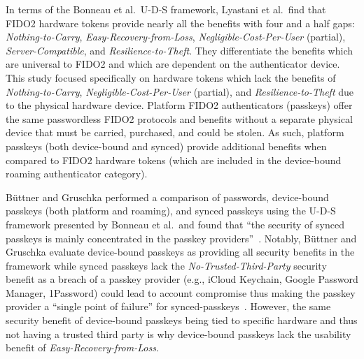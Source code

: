In terms of the Bonneau et al.\ U-D-S framework, Lyastani et al.\ find that FIDO2 hardware tokens provide nearly all the benefits with four and a half gaps: \emph{Nothing-to-Carry}, \emph{Easy-Recovery-from-Loss}, \emph{Negligible-Cost-Per-User} (partial), \emph{Server-Compatible}, and \emph{Resilience-to-Theft}. They differentiate the benefits which are universal to FIDO2 and which are dependent on the authenticator device. This study focused specifically on hardware tokens which lack the benefits of \emph{Nothing-to-Carry}, \emph{Negligible-Cost-Per-User} (partial), and \emph{Resilience-to-Theft} due to the physical hardware device. Platform FIDO2 authenticators (passkeys) offer the same passwordless FIDO2 protocols and benefits without a separate physical device that must be carried, purchased, and could be stolen. As such, platform passkeys (both device-bound and synced) provide additional benefits when compared to FIDO2 hardware tokens (which are included in the device-bound roaming authenticator category).

B\"uttner and Gruschka performed a comparison of passwords, device-bound passkeys (both platform and roaming), and synced passkeys using the U-D-S framework presented by Bonneau et al.\ and found that ``the security of synced passkeys is mainly concentrated in the passkey providers''~\cite{buttner_passkey_2025}. Notably, B\"uttner and Gruschka evaluate device-bound passkeys as providing all security benefits in the framework while synced passkeys lack the \emph{No-Trusted-Third-Party} security benefit as a breach of a passkey provider (e.g., iCloud Keychain, Google Password Manager, 1Password) could lead to account compromise thus making the passkey provider a ``single point of failure'' for synced-passkeys~\cite{buttner_passkey_2025}. However, the same security benefit of device-bound passkeys being tied to specific hardware and thus not having a trusted third party is why device-bound passkeys lack the usability benefit of \emph{Easy-Recovery-from-Loss}.

